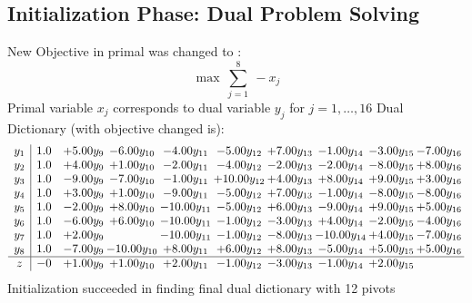 \documentclass[9pt]{article}
\begin{document}
\subsection{Initialization Phase: Dual Problem Solving}
New Objective in primal was changed to : \[ \max\ \sum_{j=1}^{8}\ - x_j \] 
Primal variable $x_j$ corresponds to dual variable $y_j$ for $j = 1,\ldots,16$
Dual Dictionary (with objective changed is): 
\[\begin{array}{c| c c@{\hskip 2pt} c@{\hskip 2pt} c@{\hskip 2pt} c@{\hskip 2pt} c@{\hskip 2pt} c@{\hskip 2pt} c@{\hskip 2pt} c@{\hskip 2pt} }
 y_{1}   &  1.0 & +  5.00 y_{9} & -6.00 y_{10} & -4.00 y_{11} & -5.00 y_{12} & +  7.00 y_{13} & -1.00 y_{14} & -3.00 y_{15} & -7.00 y_{16}\\
 y_{2}   &  1.0 & +  4.00 y_{9} & +  1.00 y_{10} & -2.00 y_{11} & -4.00 y_{12} & -2.00 y_{13} & -2.00 y_{14} & -8.00 y_{15} & +  8.00 y_{16}\\
 y_{3}   &  1.0 & -9.00 y_{9} & -7.00 y_{10} & -1.00 y_{11} & + 10.00 y_{12} & +  4.00 y_{13} & +  8.00 y_{14} & +  9.00 y_{15} & +  3.00 y_{16}\\
 y_{4}   &  1.0 & +  3.00 y_{9} & +  1.00 y_{10} & -9.00 y_{11} & -5.00 y_{12} & +  7.00 y_{13} & -1.00 y_{14} & -8.00 y_{15} & -8.00 y_{16}\\
 y_{5}   &  1.0 & -2.00 y_{9} & +  8.00 y_{10} & -10.00 y_{11} & -5.00 y_{12} & +  6.00 y_{13} & -9.00 y_{14} & +  9.00 y_{15} & +  5.00 y_{16}\\
 y_{6}   &  1.0 & -6.00 y_{9} & +  6.00 y_{10} & -10.00 y_{11} & -1.00 y_{12} & -3.00 y_{13} & +  4.00 y_{14} & -2.00 y_{15} & -4.00 y_{16}\\
 y_{7}   &  1.0 & +  2.00 y_{9} &   & -10.00 y_{11} & -1.00 y_{12} & -8.00 y_{13} & -10.00 y_{14} & +  4.00 y_{15} & -7.00 y_{16}\\
 y_{8}   &  1.0 & -7.00 y_{9} & -10.00 y_{10} & +  8.00 y_{11} & +  6.00 y_{12} & +  8.00 y_{13} & -5.00 y_{14} & +  5.00 y_{15} & +  5.00 y_{16}\\
\hline
z    &  -0 & +  1.00 y_{9} & +  1.00 y_{10} & +  2.00 y_{11} & -1.00 y_{12} & -3.00 y_{13} & -1.00 y_{14} & +  2.00 y_{15} &   \\
\end{array}\]
Initialization succeeded in finding final dual dictionary with 12 pivots
\end{document}
